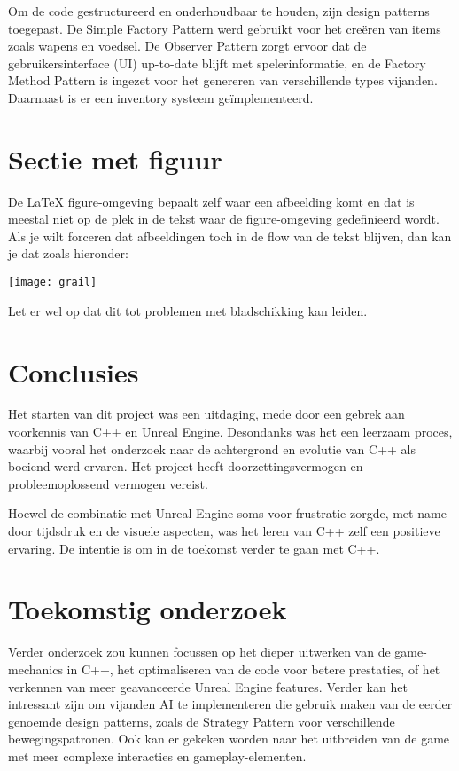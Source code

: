 \documentclass[a0,portrait]{hogent-poster}
\begin{document}
\begin{multicols}{2}
Om de code gestructureerd en onderhoudbaar te houden, zijn design patterns toegepast. De Simple Factory Pattern werd gebruikt voor het creëren van items zoals wapens en voedsel. De Observer Pattern zorgt ervoor dat de gebruikersinterface (UI) up-to-date blijft met spelerinformatie, en de Factory Method Pattern is ingezet voor het genereren van verschillende types vijanden. Daarnaast is er een inventory systeem geïmplementeerd.

\section{Sectie met figuur}

De {\LaTeX} figure-omgeving bepaalt zelf waar een afbeelding komt en dat is meestal niet op de plek in de tekst waar de figure-omgeving gedefinieerd wordt. Als je wilt forceren dat afbeeldingen toch in de flow van de tekst blijven, dan kan je dat zoals hieronder:

\begin{center}
  \captionsetup{type=figure}
  \texttt{[image: grail]}
\end{center}

Let er wel op dat dit tot problemen met bladschikking kan leiden.

\section{Conclusies}

Het starten van dit project was een uitdaging, mede door een gebrek aan voorkennis van C++ en Unreal Engine. Desondanks was het een leerzaam proces, waarbij vooral het onderzoek naar de achtergrond en evolutie van C++ als boeiend werd ervaren. Het project heeft doorzettingsvermogen en probleemoplossend vermogen vereist.

Hoewel de combinatie met Unreal Engine soms voor frustratie zorgde, met name door tijdsdruk en de visuele aspecten, was het leren van C++ zelf een positieve ervaring. De intentie is om in de toekomst verder te gaan met C++.

\section{Toekomstig onderzoek}

Verder onderzoek zou kunnen focussen op het dieper uitwerken van de game-mechanics in C++, het optimaliseren van de code voor betere prestaties, of het verkennen van meer geavanceerde Unreal Engine features. Verder kan het intressant zijn om vijanden AI te implementeren die gebruik maken van de eerder genoemde design patterns, zoals de Strategy Pattern voor verschillende bewegingspatronen. Ook kan er gekeken worden naar het uitbreiden van de game met meer complexe interacties en gameplay-elementen.
 

\end{multicols}
\end{document}
